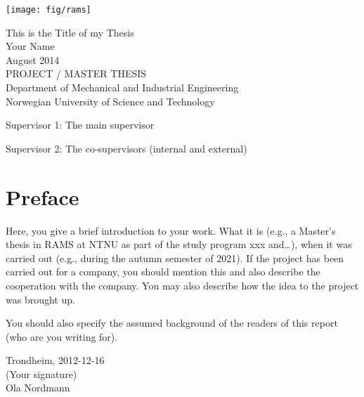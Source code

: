 \documentclass[12pt]{report}
\begin{document}

\thispagestyle{empty}
\texttt{[image: fig/rams]}
\mbox{}\\[6pc]
\begin{center}
\Huge{This is the Title of my Thesis}\\[2pc]

\Large{Your Name}\\[1pc]
\large{August 2014}\\[2pc]

PROJECT / MASTER THESIS\\
Department of Mechanical and Industrial Engineering\\
Norwegian University of Science and Technology
\end{center}
\vfill

\noindent Supervisor 1: The main supervisor

\noindent Supervisor 2: The co-supervisors (internal and external)


\setcounter{page}{0}
\section*{Preface}
Here, you give a brief introduction to your work. What it is (e.g., a Master's thesis in RAMS at NTNU as part of the study program xxx and\ldots), when it was carried out (e.g., during the autumn semester of 2021). If the project has been carried out for a company, you should mention this and also describe the cooperation with the company. You may also describe how the idea to the project was brought up.

You should also specify the assumed background of the readers of this report (who are you writing for).\\[2cm]

\begin{center}
Trondheim, 2012-12-16\\[1pc]
(Your signature)\\[1pc]
Ola Nordmann
\end{center}
\end{document}
